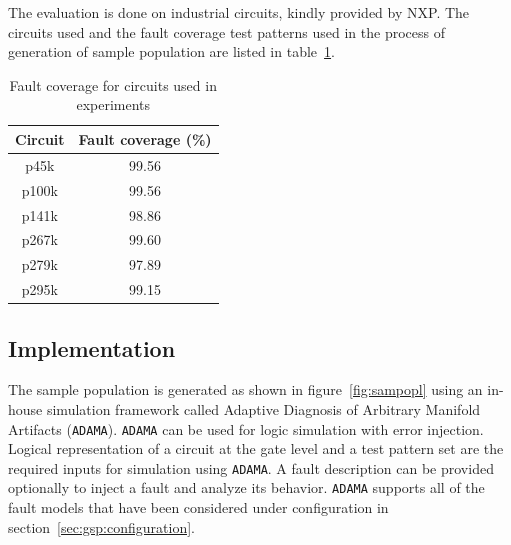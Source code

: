 The evaluation is done on industrial circuits, kindly provided by NXP. The circuits used and the fault coverage test patterns used in the process of generation of sample population are listed in table~\ref{tab:fcov}.
\begin{table}[h]
\captionsetup{justification=centering}
\begin{tabular}{cc}
\hline
\textbf{Circuit} & \textbf{Fault coverage (\%)} \\ \hline
p45k             & 99.56                        \\
p100k            & 99.56                        \\
p141k            & 98.86                        \\
p267k            & 99.60                        \\
p279k            & 97.89                        \\
p295k            & 99.15                       \\
\hline
\end{tabular}
\caption{Fault coverage for circuits used in experiments}
\label{tab:fcov}
\end{table}


\subsection{Implementation}

The sample population is generated as shown in figure~\ref{fig:sampopl} using an in-house simulation framework called Adaptive Diagnosis of Arbitrary Manifold Artifacts (\texttt{ADAMA}). \texttt{ADAMA} can be used for logic simulation with error injection. Logical representation of a circuit at the gate level and a test pattern set are the required inputs for simulation using \texttt{ADAMA}. A fault description can be provided optionally to inject a fault and analyze its behavior. \texttt{ADAMA} supports all of the fault models that have been considered under configuration in section~\ref{sec:gsp:configuration}.

